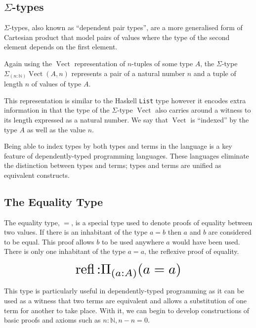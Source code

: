 \documentclass[a4paper, notitlepage]{report}
\begin{document}
\subsection{\texorpdfstring{$\Sigma$}{Sigma}-types}
\label{sec:orgf3ae87b}
\(\Sigma\)-types, also known as ``dependent pair types'', are a more generalised
form of Cartesian product that model pairs of values where the type of the
second element depends on the first element.

Again using the \(\operatorname{Vect}\) representation of \(n\textrm{-tuples}\) of
some type \(A\), the \(\Sigma\)-type \(\Sigma_{(n \mathbin{:} {\mathbb N})}
\operatorname{Vect}(A,n)\) represents a pair of a natural number \(n\) and a tuple
of length \(n\) of values of type \(A\).

This representation is similar to the Haskell \texttt{List} type however it encodes extra
information in that the type of the \(\Sigma\)-type \(\operatorname{Vect}\) also
carries around a witness to its length expressed as a natural number. We say
that \(\operatorname{Vect}\) is ``indexed'' by the type \(A\) as well as the value
\(n\).

Being able to index types by both types and terms in the language is a key
feature of dependently-typed programming languages. These languages eliminate
the distinction between types and terms; types and terms are unified as
equivalent constructs.

\subsection{The Equality Type}
\label{sec:org5038662}
The equality type, \(=\), is a special type used to denote proofs of equality
between two values. If there is an inhabitant of the type \(a \mathrel{=} b\) then
\(a\) and \(b\) are considered to be equal. This proof allows \(b\) to be used
anywhere \(a\) would have been used. There is only one inhabitant of the type \(a
\mathrel{=} a\), the reflexive proof of equality.

\[ \scalebox{2}{$\operatorname{refl} \mathbin{:} \Pi_{(a \mathbin{:} A)} (a
\mathrel{=} a)$} \]

This type is particularly useful in dependently-typed programming as it can be
used as a witness that two terms are equivalent and allows a substitution of one
term for another to take place. With it, we can begin to develop constructions
of basic proofs and axioms such as \(n \mathbin{:} {\mathbb N}, n \mathbin{-} n
\mathrel{=} 0\).
\end{document}
